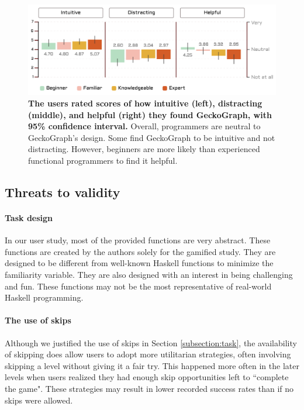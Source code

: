 \documentclass[preprint,12pt]{elsarticle}
\begin{document}

\begin{figure}[]
  \includegraphics[width=\linewidth]{figures/Qualitative}
  \caption{\label{fig:qualitative} {\bf The users rated scores of how intuitive (left), distracting (middle), and helpful (right) they found GeckoGraph, with 95\% confidence interval.} Overall, programmers are neutral to GeckoGraph's design. Some find GeckoGraph to be intuitive and not distracting. However, beginners are more likely than experienced functional programmers to find it helpful. }
\end{figure}

\subsection{Threats to validity}

\paragraph{Task design}
In our user study, most of the provided functions are very abstract. These functions are created by the authors solely for the gamified study. They are designed to be different from well-known Haskell functions to minimize the familiarity variable. They are also designed with an interest in being challenging and fun. These functions may not be the most representative of real-world Haskell programming. 

\paragraph{The use of skips}
Although we justified the use of skips in Section \ref{subsection:task}, the availability of skipping does allow users to adopt more utilitarian strategies, often involving skipping a level without giving it a fair try. This happened more often in the later levels when users realized they had enough skip opportunities left to ``complete the game". These strategies may result in lower recorded success rates than if no skips were allowed.
\end{document}

